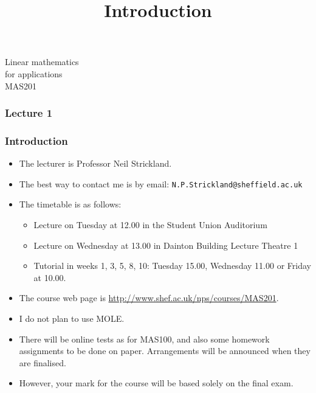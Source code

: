 \documentclass[9pt]{beamer}
\title{Introduction}
\author{}
\begin{document}



\begin{frame}[t]
\frametitle{}
 {\Huge
  \vspace{6ex}
  \begin{center}
   Linear mathematics\\for applications\\MAS201
  \end{center}
 }
\end{frame}

\begin{frame}\frametitle{Lecture 1}\end{frame}

\begin{frame}[t]
 \frametitle{Introduction}
 \begin{itemize}
  \item<1-> The lecturer is Professor Neil Strickland.
  \item<2-> The best way to contact me is by email:
   \texttt{N.P.Strickland@sheffield.ac.uk}
  \item<3-> The timetable is as follows:
   \begin{itemize}
    \item<4-> Lecture on Tuesday at 12.00 in the Student Union Auditorium
    \item<5-> Lecture on Wednesday at 13.00 in Dainton Building Lecture Theatre 1
    \item<6-> Tutorial in weeks 1, 3, 5, 8, 10: Tuesday 15.00, Wednesday 11.00 
     or Friday at 10.00.
   \end{itemize}
  \item<7-> The course web page is \url{http://www.shef.ac.uk/nps/courses/MAS201}.
  \item<8-> I do not plan to use MOLE.
  \item<9-> There will be online tests as for MAS100, and also some 
   homework assignments to be done on paper.  Arrangements will be
   announced when they are finalised.
  \item<10-> However, your mark for the course will be based solely on
   the final exam.
 \end{itemize}
\end{frame}
\end{document}
